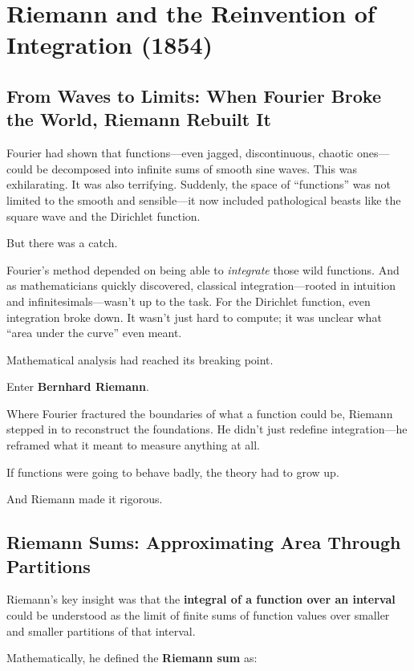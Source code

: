 \section{Riemann and the Reinvention of Integration (1854)}

\subsection{From Waves to Limits: When Fourier Broke the World, Riemann Rebuilt It}

Fourier had shown that functions—even jagged, discontinuous, chaotic ones—could be decomposed into infinite sums of smooth sine waves. This was exhilarating. It was also terrifying. Suddenly, the space of “functions” was not limited to the smooth and sensible—it now included pathological beasts like the square wave and the Dirichlet function.

But there was a catch.

Fourier’s method depended on being able to \emph{integrate} those wild functions. And as mathematicians quickly discovered, classical integration—rooted in intuition and infinitesimals—wasn’t up to the task. For the Dirichlet function, even integration broke down. It wasn’t just hard to compute; it was unclear what “area under the curve” even meant.

Mathematical analysis had reached its breaking point.

\medskip

Enter \textbf{Bernhard Riemann}.

Where Fourier fractured the boundaries of what a function could be, Riemann stepped in to reconstruct the foundations. He didn’t just redefine integration—he reframed what it meant to measure anything at all. 

If functions were going to behave badly, the theory had to grow up.

And Riemann made it rigorous.


\subsection{Riemann Sums: Approximating Area Through Partitions}

Riemann’s key insight was that the \textbf{integral of a function over an interval} could be understood as the limit of finite sums of function values over smaller and smaller partitions of that interval.  

Mathematically, he defined the \textbf{Riemann sum} as:  

